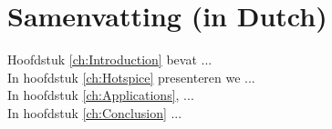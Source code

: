 \chapter*{Samenvatting (in Dutch)}

Hoofdstuk \ref{ch:Introduction} bevat ... \\

In hoofdstuk \ref{ch:Hotspice} presenteren we ... \\

In hoofdstuk \ref{ch:Applications}, ... \\

In hoofdstuk \ref{ch:Conclusion} ...
